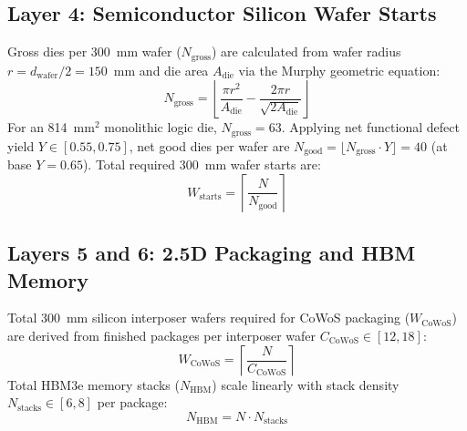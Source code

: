 \documentclass[conference]{IEEEtran}
\begin{document}
\subsection{Layer 4: Semiconductor Silicon Wafer Starts}
Gross dies per 300~mm wafer ($N_{\text{gross}}$) are calculated from wafer radius $r = d_{\text{wafer}}/2 = 150$~mm and die area $A_{\text{die}}$ via the Murphy geometric equation:
\begin{equation}
N_{\text{gross}} = \left\lfloor \frac{\pi r^2}{A_{\text{die}}} - \frac{2 \pi r}{\sqrt{2 A_{\text{die}}}} \right\rfloor
\label{eq:gross_dies}
\end{equation}
For an 814~mm$^2$ monolithic logic die, $N_{\text{gross}} = 63$. Applying net functional defect yield $Y \in [0.55, 0.75]$, net good dies per wafer are $N_{\text{good}} = \lfloor N_{\text{gross}} \cdot Y \rfloor = 40$ (at base $Y=0.65$). Total required 300~mm wafer starts are:
\begin{equation}
W_{\text{starts}} = \left\lceil \frac{N}{N_{\text{good}}} \right\rceil
\label{eq:wafer_starts}
\end{equation}

\subsection{Layers 5 and 6: 2.5D Packaging and HBM Memory}
Total 300~mm silicon interposer wafers required for CoWoS packaging ($W_{\text{CoWoS}}$) are derived from finished packages per interposer wafer $C_{\text{CoWoS}} \in [12, 18]$:
\begin{equation}
W_{\text{CoWoS}} = \left\lceil \frac{N}{C_{\text{CoWoS}}} \right\rceil
\label{eq:cowos}
\end{equation}
Total HBM3e memory stacks ($N_{\text{HBM}}$) scale linearly with stack density $N_{\text{stacks}} \in [6, 8]$ per package:
\begin{equation}
N_{\text{HBM}} = N \cdot N_{\text{stacks}}
\label{eq:hbm}
\end{equation}
\end{document}
